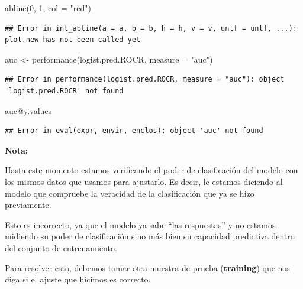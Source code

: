 \documentclass[
  12pt,
]{book}
\newenvironment{Shaded}{\begin{snugshade}}{\end{snugshade}}
\newcommand{\AttributeTok}[1]{\textcolor[rgb]{0.77,0.63,0.00}{#1}}
\newcommand{\DecValTok}[1]{\textcolor[rgb]{0.00,0.00,0.81}{#1}}
\newcommand{\FunctionTok}[1]{\textcolor[rgb]{0.00,0.00,0.00}{#1}}
\newcommand{\NormalTok}[1]{#1}
\newcommand{\OtherTok}[1]{\textcolor[rgb]{0.56,0.35,0.01}{#1}}
\newcommand{\SpecialCharTok}[1]{\textcolor[rgb]{0.00,0.00,0.00}{#1}}
\newcommand{\StringTok}[1]{\textcolor[rgb]{0.31,0.60,0.02}{#1}}
\theoremstyle{definition}
\theoremstyle{definition}
\theoremstyle{definition}
\theoremstyle{definition}
\theoremstyle{remark}
\begin{document}
\begin{Shaded}
\begin{Highlighting}[]
\FunctionTok{abline}\NormalTok{(}\DecValTok{0}\NormalTok{, }\DecValTok{1}\NormalTok{, }\AttributeTok{col =} \StringTok{"red"}\NormalTok{)}
\end{Highlighting}
\end{Shaded}

\begin{verbatim}
## Error in int_abline(a = a, b = b, h = h, v = v, untf = untf, ...): plot.new has not been called yet
\end{verbatim}

\begin{Shaded}
\begin{Highlighting}[]
\NormalTok{auc }\OtherTok{\textless{}{-}} \FunctionTok{performance}\NormalTok{(logist.pred.ROCR, }\AttributeTok{measure =} \StringTok{"auc"}\NormalTok{)}
\end{Highlighting}
\end{Shaded}

\begin{verbatim}
## Error in performance(logist.pred.ROCR, measure = "auc"): object 'logist.pred.ROCR' not found
\end{verbatim}

\begin{Shaded}
\begin{Highlighting}[]
\NormalTok{auc}\SpecialCharTok{@}\NormalTok{y.values}
\end{Highlighting}
\end{Shaded}

\begin{verbatim}
## Error in eval(expr, envir, enclos): object 'auc' not found
\end{verbatim}

\textbf{Nota:}

Hasta este momento estamos verificando el poder de clasificación del modelo con los mismos datos que usamos para ajustarlo. Es decir, le estamos diciendo al modelo que compruebe la veracidad de la clasificación que ya se hizo previamente.

Esto es incorrecto, ya que el modelo ya sabe ``las respuestas'' y no estamos midiendo su poder de clasificación sino más bien su capacidad predictiva dentro del conjunto de entrenamiento.

Para resolver esto, debemos tomar otra muestra de prueba (\textbf{training}) que nos diga si el ajuste que hicimos es correcto.
\end{document}
